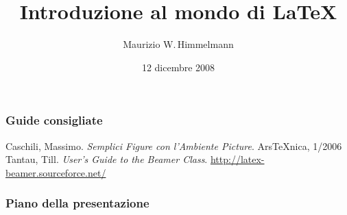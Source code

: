 \documentclass[svgnames,%
	ucs,%
	pdftex]{guitbeamer}
\title{Introduzione al mondo di \LaTeX}
\author[Maurizio W.\,Himmelmann]{Maurizio W.\,Himmelmann}
\date{12 dicembre 2008} %
\begin{document}
\frame{\titlepage}
\begin{frame}
  \frametitle{Guide consigliate}
	\begin{thebibliography}{Fer66}
			Caschili, Massimo.
			\newblock\textit{Semplici Figure con l'Ambiente Picture}.
			\newblock  Ars\TeX nica, 1/2006
			Tantau, Till.
			\newblock\textit{User's Guide to the Beamer Class}.
			\newblock
			{\small\url{http://latex-beamer.sourceforce.net/}}
	\end{thebibliography}
\end{frame}
\begin{frame}
  \frametitle{Piano della presentazione}
  \tableofcontents
\end{frame}
\end{document}
